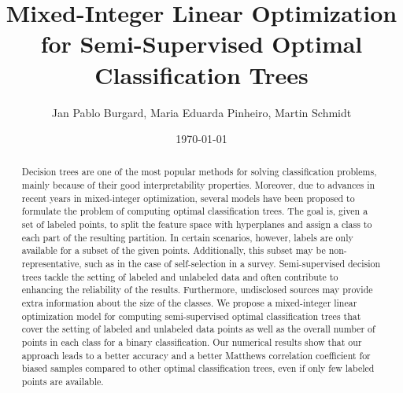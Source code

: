 \documentclass[a4paper,american,reqno]{amsart}
\newcommand{\rev}[1]{#1}
\begin{document}
\title[MILP for Semi-Supervised Optimal Classification Trees]%
{Mixed-Integer Linear Optimization\\
  for Semi-Supervised Optimal Classification Trees}

\author[J. P. Burgard, M. E. Pinheiro, M. Schmidt]%
{Jan Pablo Burgard, Maria Eduarda Pinheiro, Martin Schmidt}

\address[J. P. Burgard]{%
  Trier University,
  Department of Economic and Social Statistics,
  Universitätsring 15,
  54296 Trier,
  Germany}

\address[M. E. Pinheiro, M. Schmidt]{%
  Trier University,
  Department of Mathematics,
  Universitätsring 15,
  54296 Trier,
  Germany}

\date{\today}

\begin{abstract}
Decision trees are one of the most \rev{popular} methods for solving
classification problems, mainly because of their good
interpretability properties.
Moreover, due to advances in recent years in mixed-integer
optimization, several models have been proposed to formulate the
problem of computing optimal classification trees.
The goal is, given a set of labeled points, to split the feature space
with hyperplanes and assign a class to each \rev{part of the resulting
  partition}.
In certain scenarios, however, labels are \rev{only available} for a
subset of the given points.
Additionally, this subset may be non-representative, such as in the
case of self-selection in a survey.
Semi-supervised decision trees tackle the setting of labeled and
unlabeled data and often contribute to enhancing the reliability of
the results.
Furthermore, undisclosed sources may provide extra information about
the size of the classes.
We propose a mixed-integer linear optimization model for computing
semi-supervised optimal classification trees that cover
the setting of labeled and unlabeled data points as well as the
overall number of points in each class for a binary classification.
Our numerical results show that our approach leads to a better
accuracy and a better Matthews correlation coefficient for biased
samples compared to other optimal classification trees, even if only
few labeled points are available.



\end{abstract}
\end{document}
